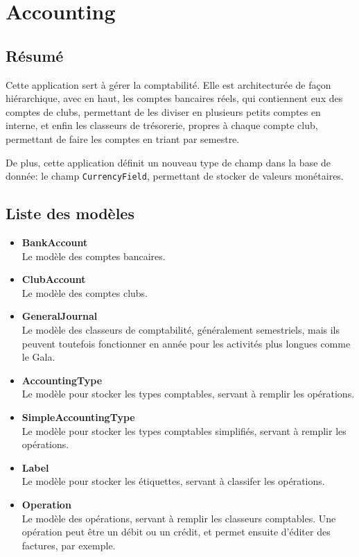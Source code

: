 \documentclass[a4paper]{report}
\begin{document}
\section{Accounting}
\label{sec:accounting}
\subsection{Résumé}
\label{sub:resume}
\par Cette application sert à gérer la comptabilité. Elle est architecturée de façon hiérarchique, avec en haut, les
comptes bancaires réels, qui contiennent eux des comptes de clubs, permettant de les diviser en plusieurs petits comptes
en interne, et enfin les classeurs de trésorerie, propres à chaque compte club, permettant de faire les comptes en
triant par semestre.
\par De plus, cette application définit un nouveau type de champ dans la base de donnée: le champ \verb#CurrencyField#,
permettant de stocker de valeurs monétaires.

\subsection{Liste des modèles}
\label{sub:liste_des_modeles}
\begin{itemize}
    \item \textbf{BankAccount} \\
        Le modèle des comptes bancaires.
    \item \textbf{ClubAccount} \\
        Le modèle des comptes clubs.
    \item \textbf{GeneralJournal} \\
        Le modèle des classeurs de comptabilité, généralement semestriels, mais ils peuvent toutefois fonctionner en
        année pour les activités plus longues comme le Gala.
    \item \textbf{AccountingType} \\
        Le modèle pour stocker les types comptables, servant à remplir les opérations.
    \item \textbf{SimpleAccountingType} \\
        Le modèle pour stocker les types comptables simplifiés, servant à remplir les opérations.
    \item \textbf{Label} \\
        Le modèle pour stocker les étiquettes, servant à classifer les opérations.
    \item \textbf{Operation} \\
        Le modèle des opérations, servant à remplir les classeurs comptables. Une opération peut être un débit ou un
        crédit, et permet ensuite d'éditer des factures, par exemple.
\end{itemize}
\end{document}
